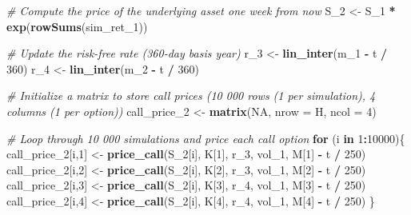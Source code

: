 \documentclass[]{article}
\newenvironment{Shaded}{\begin{snugshade}}{\end{snugshade}}
\newcommand{\CommentTok}[1]{\textcolor[rgb]{0.56,0.35,0.01}{\textit{#1}}}
\newcommand{\ControlFlowTok}[1]{\textcolor[rgb]{0.13,0.29,0.53}{\textbf{#1}}}
\newcommand{\DataTypeTok}[1]{\textcolor[rgb]{0.13,0.29,0.53}{#1}}
\newcommand{\DecValTok}[1]{\textcolor[rgb]{0.00,0.00,0.81}{#1}}
\newcommand{\KeywordTok}[1]{\textcolor[rgb]{0.13,0.29,0.53}{\textbf{#1}}}
\newcommand{\NormalTok}[1]{#1}
\newcommand{\OperatorTok}[1]{\textcolor[rgb]{0.81,0.36,0.00}{\textbf{#1}}}
\newcommand{\OtherTok}[1]{\textcolor[rgb]{0.56,0.35,0.01}{#1}}
\newcommand{\StringTok}[1]{\textcolor[rgb]{0.31,0.60,0.02}{#1}}
\begin{document}
\begin{Shaded}
\begin{Highlighting}[]
\CommentTok{# Compute the price of the underlying asset one week from now}
\NormalTok{S_}\DecValTok{2}\NormalTok{ <-}\StringTok{ }\NormalTok{S_}\DecValTok{1} \OperatorTok{*}\StringTok{ }\KeywordTok{exp}\NormalTok{(}\KeywordTok{rowSums}\NormalTok{(sim_ret_}\DecValTok{1}\NormalTok{))}

\CommentTok{# Update the risk-free rate (360-day basis year)}
\NormalTok{r_}\DecValTok{3}\NormalTok{   <-}\StringTok{ }\KeywordTok{lin_inter}\NormalTok{(m_}\DecValTok{1} \OperatorTok{-}\StringTok{ }\NormalTok{t }\OperatorTok{/}\StringTok{ }\DecValTok{360}\NormalTok{)}
\NormalTok{r_}\DecValTok{4}\NormalTok{   <-}\StringTok{ }\KeywordTok{lin_inter}\NormalTok{(m_}\DecValTok{2} \OperatorTok{-}\StringTok{ }\NormalTok{t }\OperatorTok{/}\StringTok{ }\DecValTok{360}\NormalTok{)}

\CommentTok{# Initialize a matrix to store call prices (10 000 rows (1 per simulation), 4 columns (1 per option))}
\NormalTok{call_price_}\DecValTok{2}\NormalTok{ <-}\StringTok{ }\KeywordTok{matrix}\NormalTok{(}\OtherTok{NA}\NormalTok{, }\DataTypeTok{nrow =}\NormalTok{ H, }\DataTypeTok{ncol =} \DecValTok{4}\NormalTok{)}

\CommentTok{# Loop through 10 000 simulations and price each call option}
\ControlFlowTok{for}\NormalTok{ (i }\ControlFlowTok{in} \DecValTok{1}\OperatorTok{:}\DecValTok{10000}\NormalTok{)\{}
\NormalTok{  call_price_}\DecValTok{2}\NormalTok{[i,}\DecValTok{1}\NormalTok{] <-}\StringTok{ }\KeywordTok{price_call}\NormalTok{(S_}\DecValTok{2}\NormalTok{[i], K[}\DecValTok{1}\NormalTok{], r_}\DecValTok{3}\NormalTok{, vol_}\DecValTok{1}\NormalTok{, M[}\DecValTok{1}\NormalTok{] }\OperatorTok{-}\StringTok{ }\NormalTok{t }\OperatorTok{/}\StringTok{ }\DecValTok{250}\NormalTok{)}
\NormalTok{  call_price_}\DecValTok{2}\NormalTok{[i,}\DecValTok{2}\NormalTok{] <-}\StringTok{ }\KeywordTok{price_call}\NormalTok{(S_}\DecValTok{2}\NormalTok{[i], K[}\DecValTok{2}\NormalTok{], r_}\DecValTok{3}\NormalTok{, vol_}\DecValTok{1}\NormalTok{, M[}\DecValTok{2}\NormalTok{] }\OperatorTok{-}\StringTok{ }\NormalTok{t }\OperatorTok{/}\StringTok{ }\DecValTok{250}\NormalTok{)}
\NormalTok{  call_price_}\DecValTok{2}\NormalTok{[i,}\DecValTok{3}\NormalTok{] <-}\StringTok{ }\KeywordTok{price_call}\NormalTok{(S_}\DecValTok{2}\NormalTok{[i], K[}\DecValTok{3}\NormalTok{], r_}\DecValTok{4}\NormalTok{, vol_}\DecValTok{1}\NormalTok{, M[}\DecValTok{3}\NormalTok{] }\OperatorTok{-}\StringTok{ }\NormalTok{t }\OperatorTok{/}\StringTok{ }\DecValTok{250}\NormalTok{)}
\NormalTok{  call_price_}\DecValTok{2}\NormalTok{[i,}\DecValTok{4}\NormalTok{] <-}\StringTok{ }\KeywordTok{price_call}\NormalTok{(S_}\DecValTok{2}\NormalTok{[i], K[}\DecValTok{4}\NormalTok{], r_}\DecValTok{4}\NormalTok{, vol_}\DecValTok{1}\NormalTok{, M[}\DecValTok{4}\NormalTok{] }\OperatorTok{-}\StringTok{ }\NormalTok{t }\OperatorTok{/}\StringTok{ }\DecValTok{250}\NormalTok{)}
\NormalTok{\}}
\end{Highlighting}
\end{Shaded}
\end{document}
